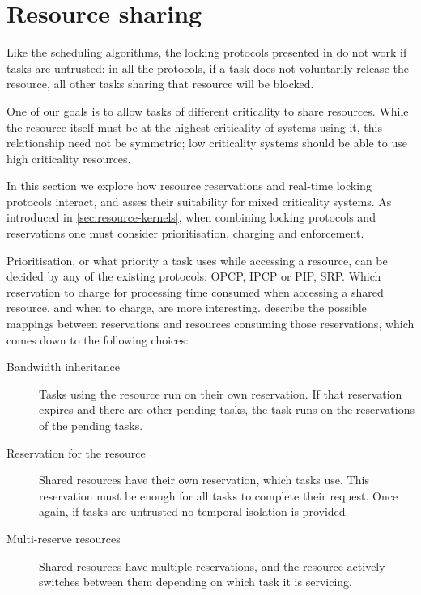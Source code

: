 \section{Resource sharing}

Like the scheduling algorithms, the locking protocols presented in
 do not work if tasks are untrusted: in all the protocols, if a
task does not voluntarily release the resource, all other tasks sharing that resource will be
blocked.

One of our goals is to allow tasks of different criticality to share resources.  While the resource
itself must be at the highest criticality of systems using it, this relationship need not be
symmetric; low criticality systems should be able to use high criticality resources.

In this section we explore how resource reservations and real-time locking protocols interact, and
asses their suitability for mixed criticality systems.  As introduced in
\cref{sec:resource-kernels}, when combining locking protocols and reservations one must consider
prioritisation, charging and enforcement.

Prioritisation, or what priority a task uses while accessing a resource, can be decided by any of
the existing protocols: \gls{OPCP}, \gls{IPCP} or \gls{PIP}, \gls{SRP}. Which reservation to charge 
for processing time consumed when accessing a shared resource, and when to charge, are more
interesting. \citet{deNiz_LSR_01} describe the possible mappings
between reservations and resources consuming those reservations, which comes down to the following
choices:

\begin{description}
\item[Bandwidth inheritance] Tasks using the resource run on their own reservation.  If that
    reservation expires and there are other pending tasks, the task runs on the reservations of the
    pending tasks. 
\item[Reservation for the resource] Shared resources have their own reservation, which tasks use.
    This reservation must be enough for all tasks to complete their request.  Once again, if tasks
    are untrusted no temporal isolation is provided. 
\item[Multi-reserve resources] Shared resources have multiple reservations, and the resource
    actively switches between them depending on which task it is servicing. 
\end{description} 

